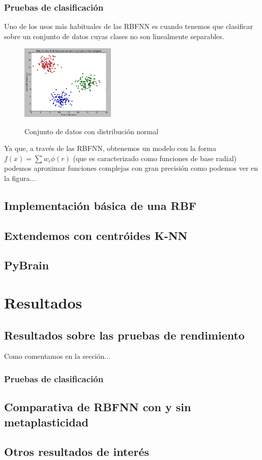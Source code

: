 \documentclass[10pt,a4paper, twocolumn]{report}
\begin{document}
\subsection{Pruebas de clasificación}
Uno de los usos más habituales de las RBFNN es cuando tenemos que clasificar sobre un conjunto de datos cuyas clases no son linealmente separables.
\begin{figure}[!h]{}
    \centering
    \includegraphics[width=0.4\textwidth]{img/clusteredData1.png}
    \label{fig:Suscripcion}
    \caption{Conjunto de datos con distribución normal}
\end{figure}
Ya que, a través de las RBFNN, obtenemos un modelo con la forma $f(x)=\sum w_{i}\phi(r)$ (que es caracterizado como funciones de base radial) podemos aproximar funciones complejas con gran precisión como podemos ver en la figura...
\section{Implementación básica de una RBF}

\section{Extendemos con centróides K-NN}
\section{PyBrain}


\chapter{Resultados}
\section{Resultados sobre las pruebas de rendimiento}
Como comentamos en la sección... 
\subsection{Pruebas de clasificación}
\section{Comparativa de RBFNN con y sin metaplasticidad}
\section{Otros resultados de interés}
\end{document}
